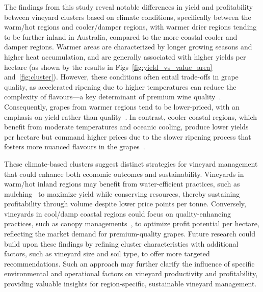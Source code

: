 \documentclass[10pt,letterpaper]{article}
\begin{document}
The findings from this study reveal notable differences in yield and profitability between vineyard clusters based on climate conditions, specifically between the warm/hot regions and cooler/damper regions, with warmer drier regions tending to be further inland in Australia, compared to the more coastal cooler and damper regions. Warmer areas are characterized by longer growing seasons and higher heat accumulation, and are generally associated with higher yields per hectare (as shown by the results in Figs~\ref{fig:yield_vs_value_area} and~\ref{fig:cluster}). However, these conditions often entail trade-offs in grape quality, as accelerated ripening due to higher temperatures can reduce the complexity of flavours—a key determinant of premium wine quality~\cite{jones2005climate, gladstones2011wine}. Consequently, grapes from warmer regions tend to be lower-priced, with an emphasis on yield rather than quality~\cite{schamel2003wine}. In contrast, cooler coastal regions, which benefit from moderate temperatures and oceanic cooling, produce lower yields per hectare but command higher prices due to the slower ripening process that fosters more nuanced flavours in the grapes~\cite{gladstones2011wine, mira_de_orduna_climate_2010}.
\par
These climate-based clusters suggest distinct strategies for vineyard management that could enhance both economic outcomes and sustainability. Vineyards in warm/hot inland regions may benefit from water-efficient practices, such as mulching~\cite{rossertWoodchipsPotatoChips2022} to maximize yield while conserving resources, thereby sustaining profitability through volume despite lower price points per tonne. Conversely, vineyards in cool/damp coastal regions could focus on quality-enhancing practices, such as canopy managements~\cite{delpuechAdaptingCoverCrop2018}, to optimize profit potential per hectare, reflecting the market demand for premium-quality grapes. Future research could build upon these findings by refining cluster characteristics with additional factors, such as vineyard size and soil type, to offer more targeted recommendations. Such an approach may further clarify the influence of specific environmental and operational factors on vineyard productivity and profitability, providing valuable insights for region-specific, sustainable vineyard management.
\par
\end{document}
